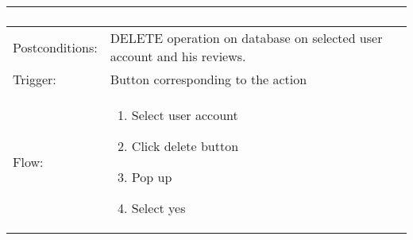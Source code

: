 \begin{longtable}{| p{3.5cm} | p{9cm} |}
\begin{enumerate}
\end{enumerate}\\
\hline
Postconditions: & DELETE operation on database on selected user account and his reviews.\\
\hline
Trigger: & Button corresponding to the action\\
\hline
Flow: &\mbox{}\par\vspace{-\baselineskip}
\begin{enumerate}
\item Select user account
\item Click delete button
\item Pop up
\item Select yes 
\end{enumerate}\\
\hline
\end{longtable}


